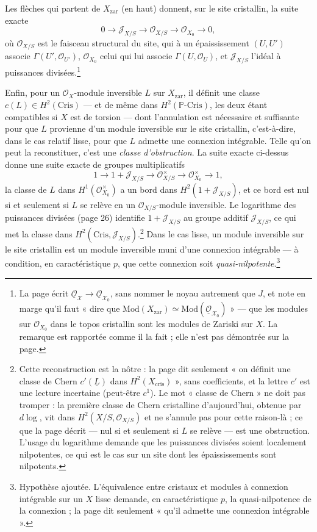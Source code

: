 \documentclass[11pt,a4paper]{article}
\begin{document}
Les flèches qui partent de $X_{\mathrm{zar}}$ (en haut) donnent, sur le site
cristallin, la suite exacte
\[
0 \longrightarrow \mathcal{J}_{X/S} \longrightarrow \mathcal{O}_{X/S}
\longrightarrow \mathcal{O}_{X_0} \longrightarrow 0,
\]
où $\mathcal{O}_{X/S}$ est le faisceau structural du site, qui à un
épaississement $(U, U')$ associe $\Gamma(U', \mathcal{O}_{U'})$,
$\mathcal{O}_{X_0}$ celui qui lui associe $\Gamma(U, \mathcal{O}_U)$, et
$\mathcal{J}_{X/S}$ l'idéal à puissances divisées.\footnote{La page écrit
$\underline{\mathcal{O}}_{\mathcal{X}} \to
\underline{\mathcal{O}}_{\mathcal{X}_0}$, sans nommer le noyau autrement que
$J$, et note en marge qu'il faut « dire que
$\mathrm{Mod}(X_{\mathrm{zar}}) \simeq
\mathrm{Mod}(\underline{\mathcal{O}}_{\mathcal{X}_0})$ » — que les
modules sur $\mathcal{O}_{X_0}$ dans le topos cristallin sont les modules de
Zariski sur $X$. La remarque est rapportée comme il la fait ; elle n'est pas
démontrée sur la page.}

Enfin, pour un $\mathcal{O}_X$-module inversible $L$ sur $X_{\mathrm{zar}}$,
il définit une classe $c(L) \in H^{2}(\mathrm{Cris})$ — et de même dans
$H^{2}(\mathbb{P}\text{-}\mathrm{Cris})$, les deux étant compatibles si $X$
est de torsion — dont l'annulation est nécessaire et suffisante pour que $L$
provienne d'un module inversible sur le site cristallin, c'est-à-dire, dans
le cas relatif lisse, pour que $L$ admette une connexion intégrable. Telle
qu'on peut la reconstituer, c'est une \emph{classe d'obstruction}. La suite
exacte ci-dessus donne une suite exacte de groupes multiplicatifs
\[
1 \longrightarrow 1 + \mathcal{J}_{X/S} \longrightarrow
\mathcal{O}_{X/S}^{\times} \longrightarrow \mathcal{O}_{X_0}^{\times}
\longrightarrow 1,
\]
la classe de $L$ dans $H^{1}(\mathcal{O}_{X_0}^{\times})$ a un bord dans
$H^{2}(1 + \mathcal{J}_{X/S})$, et ce bord est nul si et seulement si $L$ se
relève en un $\mathcal{O}_{X/S}$-module inversible. Le logarithme des
puissances divisées (page 26) identifie $1 + \mathcal{J}_{X/S}$ au groupe
additif $\mathcal{J}_{X/S}$, ce qui met la classe dans
$H^{2}(\mathrm{Cris}, \mathcal{J}_{X/S})$.\footnote{Cette reconstruction est
la nôtre : la page dit seulement « on définit une classe de Chern
$c'(\underline{L})$ dans $H^{2}(X_{\mathrm{cris}})$ », sans coefficients, et
la lettre $c'$ est une lecture incertaine (peut-être $c^{1}$). Le mot
« classe de Chern » ne doit pas tromper : la première classe de Chern
cristalline d'aujourd'hui, obtenue par $d\log$, vit dans
$H^{2}(X/S, \mathcal{O}_{X/S})$ et ne s'annule pas pour cette raison-là ;
ce que la page décrit — nul si et seulement si $L$ se relève — est une
obstruction. L'usage du logarithme demande que les puissances divisées
soient localement nilpotentes, ce qui est le cas sur un site dont les
épaississements sont nilpotents.} Dans le cas lisse, un module inversible
sur le site cristallin est un module inversible muni d'une connexion
intégrable — à condition, en caractéristique $p$, que cette connexion soit
\emph{quasi-nilpotente}.\footnote{Hypothèse ajoutée. L'équivalence entre
cristaux et modules à connexion intégrable sur un $X$ lisse demande, en
caractéristique $p$, la quasi-nilpotence de la connexion ; la page dit
seulement « qu'il admette une connexion intégrable ».}
\end{document}
